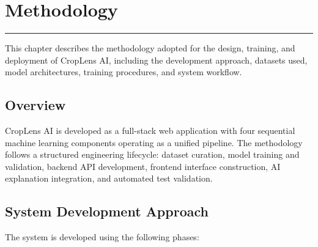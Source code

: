 \chapter{Methodology}
\noindent\rule{\linewidth}{2pt}
This chapter describes the methodology adopted for the design, training, and deployment of CropLens AI, including the development approach, datasets used, model architectures, training procedures, and system workflow.

\section{Overview}

CropLens AI is developed as a full-stack web application with four sequential machine learning components operating as a unified pipeline. The methodology follows a structured engineering lifecycle: dataset curation, model training and validation, backend API development, frontend interface construction, AI explanation integration, and automated test validation.

\section{System Development Approach}

The system is developed using the following phases:

